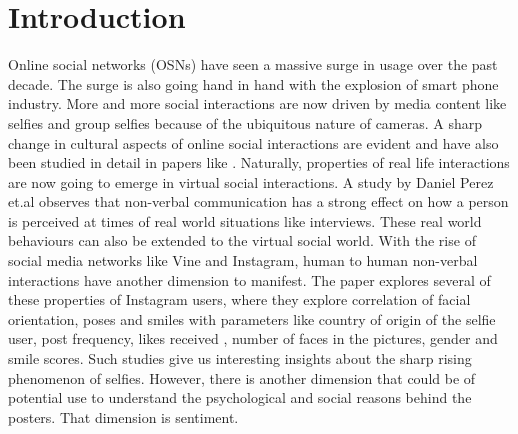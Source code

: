 \section{Introduction}
Online social networks (OSNs) have seen a massive surge in usage over the past decade. The surge is also going hand in hand with the explosion of smart phone industry. More and more social interactions are now driven by media content like selfies and group selfies because of the ubiquitous nature of cameras. A sharp change in cultural aspects of online social interactions are evident and have also been studied in detail in papers like \cite{Souza2015}. Naturally, properties of real life interactions are now going to emerge in virtual social interactions. A study by Daniel Perez et.al \cite{7175072} observes that non-verbal communication has a strong effect on how a person is perceived at times of real world situations like interviews. These real world behaviours can also be extended to the virtual social world. With the rise of social media networks like Vine and Instagram, human to human non-verbal interactions have another dimension to manifest. 
The \cite{Souza2015} paper explores several of these properties of Instagram users, where they explore correlation of facial orientation, poses and smiles with parameters like country of origin of the selfie user, post frequency, likes received , number of faces in the pictures, gender and smile scores. Such studies give us interesting insights about the sharp rising phenomenon of selfies. However, there is another dimension that could be of potential use to understand the psychological and social reasons behind the posters. That dimension is sentiment. 